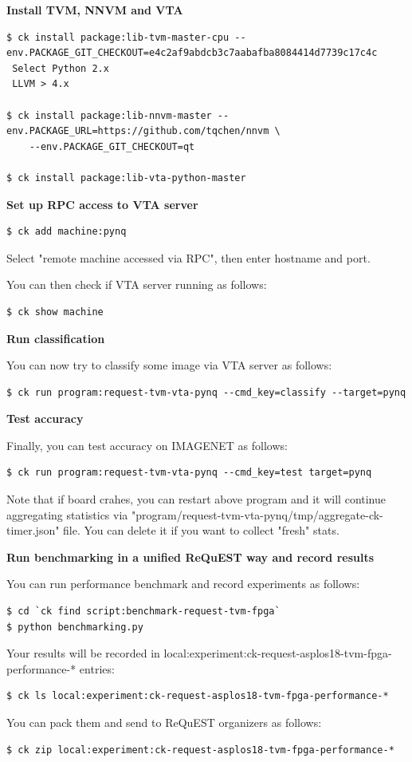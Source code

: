 \documentclass[sigconf]{acmart}
\begin{document}
\textbf{Install TVM, NNVM and VTA}

\begin{verbatim}
$ ck install package:lib-tvm-master-cpu --env.PACKAGE_GIT_CHECKOUT=e4c2af9abdcb3c7aabafba8084414d7739c17c4c
 Select Python 2.x
 LLVM > 4.x

$ ck install package:lib-nnvm-master --env.PACKAGE_URL=https://github.com/tqchen/nnvm \
    --env.PACKAGE_GIT_CHECKOUT=qt

$ ck install package:lib-vta-python-master
\end{verbatim}

\textbf{Set up RPC access to VTA server}

\begin{verbatim}
$ ck add machine:pynq
\end{verbatim}

Select "remote machine accessed via RPC", then enter hostname and port.

You can then check if VTA server running as follows:

\begin{verbatim}
$ ck show machine
\end{verbatim}

\textbf{Run classification}

You can now try to classify some image via VTA server as follows:

\begin{verbatim}
$ ck run program:request-tvm-vta-pynq --cmd_key=classify --target=pynq
\end{verbatim}

\textbf{Test accuracy}

Finally, you can test accuracy on IMAGENET as follows:

\begin{verbatim}
$ ck run program:request-tvm-vta-pynq --cmd_key=test target=pynq
\end{verbatim}

Note that if board crahes, you can restart above program and it will continue aggregating statistics
via "program/request-tvm-vta-pynq/tmp/aggregate-ck-timer.json" file. 
You can delete it if you want to collect "fresh" stats.

\textbf{Run benchmarking in a unified ReQuEST way and record results}

You can run performance benchmark and record experiments as follows:

\begin{verbatim}
$ cd `ck find script:benchmark-request-tvm-fpga`
$ python benchmarking.py
\end{verbatim}

Your results will be recorded in local:experiment:ck-request-asplos18-tvm-fpga-performance-* entries:
\begin{verbatim}
$ ck ls local:experiment:ck-request-asplos18-tvm-fpga-performance-*
\end{verbatim}

You can pack them and send to ReQuEST organizers as follows:

\begin{verbatim}
$ ck zip local:experiment:ck-request-asplos18-tvm-fpga-performance-*
\end{verbatim}
\end{document}
